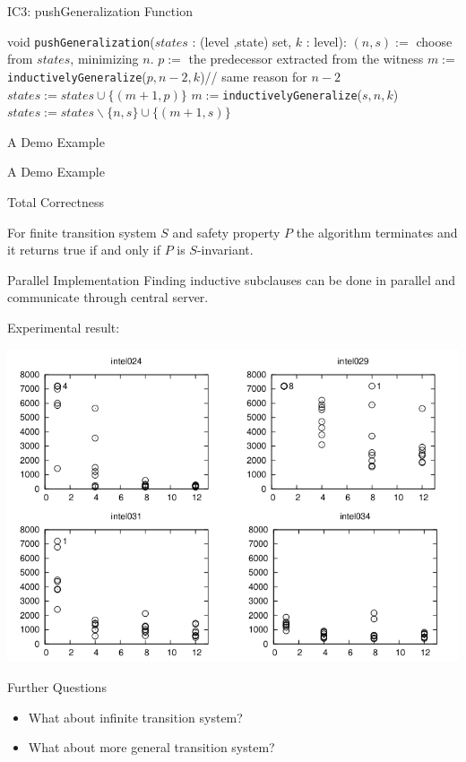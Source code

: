 \documentclass[aspectratio=1610, 13pt]{beamer}
\begin{document}
\begin{frame}{IC3: pushGeneralization Function}
\begin{algorithmic}[1]
\STATE void \texttt{pushGeneralization}($states$ : (level ,state) set,  $k$ : level):
	\STATE $(n, s) := $ choose from $states$, minimizing $n$.
		\RETURN
	\ENDIF
		\STATE $p := $ the predecessor extracted from the witness
		\STATE $m := $\texttt{inductivelyGeneralize}($p, n-2, k$)// same reason for $n-2$
		\STATE $states := states \cup \{(m + 1, p)\}$
	\ELSE
		\STATE $m := $\texttt{inductivelyGeneralize}($s, n, k$)
		\STATE $states := states\backslash\{n, s\} \cup \{(m + 1, s)\}$
	\ENDIF

\ENDWHILE
\end{algorithmic}
\end{frame}

\begin{frame}{A Demo Example}

\end{frame}
\begin{frame}{A Demo Example}

\end{frame}

\begin{frame}{Total Correctness}
\begin{theorem}
For finite transition system $S$ and safety property $P$ the algorithm terminates and it returns true if and only if $P$ is $S$-invariant.
\end{theorem}
\end{frame}


\begin{frame}{Parallel Implementation}
	Finding inductive subclauses can be done in parallel and communicate through central server.
	
Experimental result:
\begin{center}
\includegraphics[scale=0.28]{para.png}
\end{center}
\end{frame}

\begin{frame}{Further Questions}
\begin{itemize}
\item What about infinite transition system?
\item What about more general transition system?
\end{itemize}
\end{frame}
\end{document}
